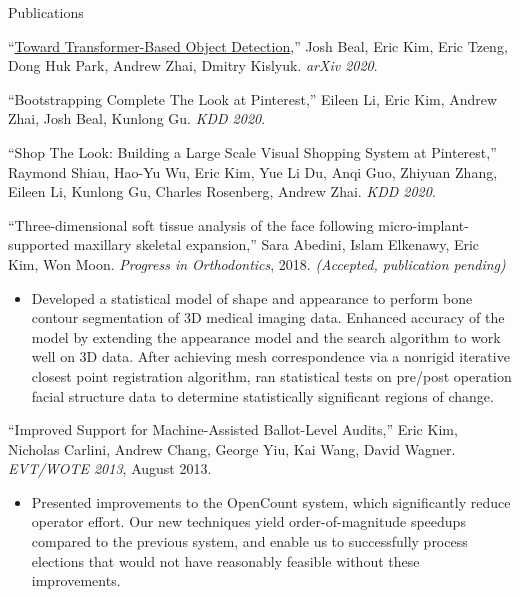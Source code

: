 \documentclass{resume}
\begin{document}
\begin{component}{Publications}
\vspace{0.5em}

``\href{https://arxiv.org/abs/2012.09958}{Toward Transformer-Based Object Detection},'' Josh Beal, Eric Kim, Eric Tzeng, Dong Huk Park, Andrew Zhai, Dmitry Kislyuk. \emph{arXiv 2020}.

\vspace{0.5em}

``Bootstrapping Complete The Look at Pinterest,'' Eileen Li, Eric Kim, Andrew Zhai, Josh Beal, Kunlong Gu. \emph{KDD 2020}.

\vspace{0.5em}

``Shop The Look: Building a Large Scale Visual Shopping System at Pinterest,'' Raymond Shiau, Hao-Yu Wu, Eric Kim, Yue Li Du, Anqi Guo, Zhiyuan Zhang, Eileen Li, Kunlong Gu, Charles Rosenberg, Andrew Zhai. \emph{KDD 2020}.

  \vspace{0.5em}
  ``Three-dimensional soft tissue analysis of the face following micro-implant-supported maxillary skeletal expansion,'' Sara Abedini, Islam Elkenawy, Eric Kim, Won Moon. \emph{Progress in Orthodontics}, 2018. \emph{(Accepted, publication pending)}
  \begin{itemize}
    \vspace{-0.5em}\item[] Developed a statistical model of shape and appearance to perform bone contour segmentation of 3D medical imaging data.
Enhanced accuracy of the model by extending the appearance model and the search algorithm to work well on 3D data.
After achieving mesh correspondence via a nonrigid iterative closest point registration algorithm, ran statistical tests on pre/post operation facial structure data to determine statistically significant regions of change.
  \end{itemize}
  
  
\vspace{0.5em}
``Improved Support for Machine-Assisted Ballot-Level Audits,'' Eric Kim, Nicholas Carlini, Andrew Chang, George Yiu, Kai Wang, David Wagner. \emph{EVT/WOTE 2013}, August 2013.
    \begin{itemize}
        \vspace{-0.5em}\item[] Presented improvements to the OpenCount system,
        which significantly reduce operator effort.
        Our new techniques yield order-of-magnitude speedups compared
        to the previous system, and enable us to successfully process
        elections that would not have reasonably feasible without these
        improvements.
    \end{itemize}
    

\end{component}
\end{document}
